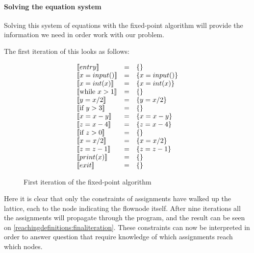 \paragraph{Solving the equation system}
Solving this system of equations with the fixed-point algorithm will provide the information we need in order work with our problem.

The first iteration of this looks as follows:

\begin{figure}[H]
\[
\begin{array}{lcl}
  \llbracket entry \rrbracket & = & \{\}\\
  \llbracket x = input() \rrbracket & = & \{x = input()\}\\
  \llbracket x = int(x) \rrbracket & = & \{x = int(x)\}\\
  \llbracket \text{while } x > 1 \rrbracket & = & \{\}\\
  \llbracket  y = x / 2 \rrbracket & = & \{ y = x / 2\}\\
  \llbracket \text{if } y > 3 \rrbracket & = & \{\}\\
  \llbracket  x = x-y \rrbracket & = & \{ x = x - y \} \\
  \llbracket  z = x-4 \rrbracket & = & \{z = x-4 \} \\
  \llbracket \text{if } z > 0 \rrbracket & = & \{\}\\
  \llbracket x = x / 2 \rrbracket & = & \{ x = x / 2 \}\\
  \llbracket z = z - 1 \rrbracket & = & \{ z = z -1 \} \\
  \llbracket print(x) \rrbracket & = & \{\}\\
  \llbracket exit \rrbracket & = & \{\}\\
\end{array}
\]
\caption{First iteration of the fixed-point algorithm}
\label{reachingdefinitions:firstiteration}
\end{figure}

Here it is clear that only the constraints of assignments have walked up the lattice, each to the node indicating the flownode itself.
After nine iterations all the assignments will propagate through the program, and the result can be seen on \cref{reachingdefinitions:finaliteration}.
These constraints can now be interpreted in order to answer question that require knowledge of which assignments reach which nodes.

